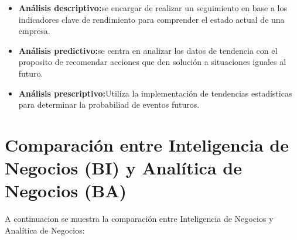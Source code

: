 \documentclass[preprint,12pt]{elsarticle}
\begin{document}
	\begin{itemize}
	\item{\textbf{Análisis descriptivo:}}se encargar de realizar un seguimiento en base a los indicadores  clave de rendimiento para 
	comprender el estado actual de una empresa. 		
	\item {\textbf{Análisis  predictivo:}}se centra en analizar los datos de tendencia con el proposito de recomendar acciones que 
	den solución a situaciones iguales al futuro.
	\item {\textbf{Análisis prescriptivo:}}Utiliza la implementación de tendencias estadísticas para determinar la probabiliad de eventos 
	futuros. 
	\end{itemize}


	


\section{Comparación entre Inteligencia de Negocios (BI) y Analítica de Negocios (BA)}

A continuacion se muestra la comparación entre Inteligencia de Negocios y Analítica de Negocios:
\end{document}
